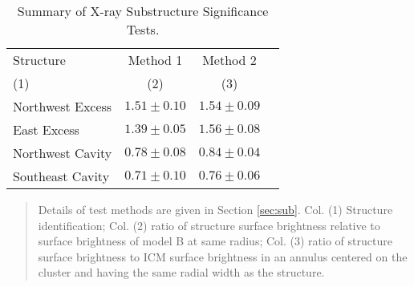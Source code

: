 \begin{table*}
  \begin{center}
    \caption{\sc Summary of X-ray Substructure Significance Tests.\label{tab:sig}}
    \begin{tabular}{lccc}
      \hline
      \hline
      Structure & Method 1 & Method 2\\
      (1) & (2) & (3)\\
      \hline
      Northwest Excess & $1.51 \pm 0.10$ & $1.54 \pm 0.09$\\
      East Excess      & $1.39 \pm 0.05$ & $1.56 \pm 0.08$\\
      Northwest Cavity & $0.78 \pm 0.08$ & $0.84 \pm 0.04$\\
      Southeast Cavity & $0.71 \pm 0.10$ & $0.76 \pm 0.06$\\
      \hline
    \end{tabular}
    \begin{quote}
      Details of test methods are given in Section
      \ref{sec:sub}. Col. (1) Structure identification; Col. (2) ratio
      of structure surface brightness relative to surface brightness
      of model B at same radius; Col. (3) ratio of structure surface
      brightness to ICM surface brightness in an annulus centered on
      the cluster and having the same radial width as the structure.
    \end{quote}
    \end{center}
\end{table*}

